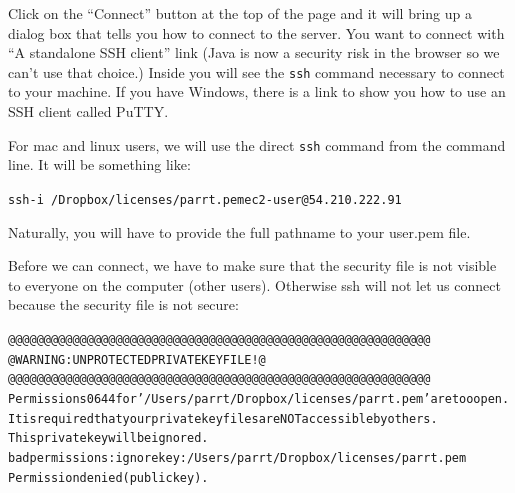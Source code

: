 \begin{fullwidth}
\step Click on the ``Connect'' button at the top of the page and it will bring up a dialog box that tells you how to connect to the server.  You want to connect with ``A standalone SSH client'' link (Java is now a security risk in the browser so we can't use that choice.)  Inside you will see the {\tt ssh} command necessary to connect to your machine. If you have Windows, there is a link to show you how to use an SSH client called PuTTY. 


For mac and linux users, we will use the direct {\tt ssh} command from the command line. It will be something like:

{\small
\begin{alltt}
ssh -i ~/Dropbox/licenses/parrt.pem ec2-user@54.210.222.91
\end{alltt}
}

\noindent Naturally, you will have to provide the full pathname to your user.pem file.

\step  Before we can connect, we have to make sure that the security file is not visible to everyone on the computer (other users). Otherwise ssh will not let us connect because the security file is not secure:

{\small
\begin{alltt}@@@@@@@@@@@@@@@@@@@@@@@@@@@@@@@@@@@@@@@@@@@@@@@@@@@@@@@@@@@
@         WARNING: UNPROTECTED PRIVATE KEY FILE!          @
@@@@@@@@@@@@@@@@@@@@@@@@@@@@@@@@@@@@@@@@@@@@@@@@@@@@@@@@@@@
Permissions 0644 for '/Users/parrt/Dropbox/licenses/parrt.pem' are too open.
It is required that your private key files are NOT accessible by others.
This private key will be ignored.
bad permissions: ignore key: /Users/parrt/Dropbox/licenses/parrt.pem
Permission denied (publickey).
\end{alltt}
}


\end{fullwidth}
